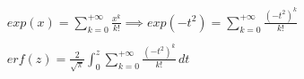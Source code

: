 \documentclass[preview]{standalone}
\begin{document}
\begin{align*}
exp(x) = \sum_{k=0}^{+\infty} { \frac{x^k}{k!} }\implies exp(-t^2) = \sum_{k=0}^{+\infty} { \frac{(-t^2)^k}{k!} } \\ \\ erf(z) = { \frac{2}{\sqrt{\pi}} } \int_0^z { \sum_{k=0}^{+\infty} { \frac{(-t^2)^k}{k!} } } \, dt
\end{align*}
\end{document}

